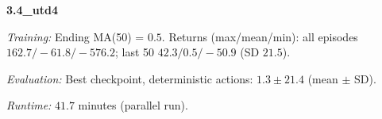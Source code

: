 \noindent\textbf{3.4_utd4}\par
\emph{Training:} Ending MA(50) = $0.5$. Returns (max/mean/min): all episodes $162.7/-61.8/-576.2$; last 50 $42.3/0.5/-50.9$ (SD $21.5$).\par
\emph{Evaluation:} Best checkpoint, deterministic actions: $1.3\pm 21.4$ (mean $\pm$ SD).\par
\emph{Runtime:} $41.7$ minutes (parallel run).\par
